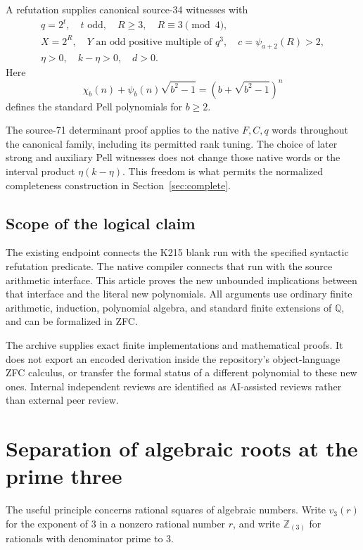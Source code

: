 \documentclass[11pt]{article}
\theoremstyle{definition}
\theoremstyle{remark}
\newcommand{\Z}{\mathbb Z}
\newcommand{\Q}{\mathbb Q}
\newcommand{\vp}{v_3}
\begin{document}
A refutation supplies canonical source-34 witnesses with
\begin{equation}
 \begin{gathered}
 q=2^t,\quad t\text{ odd},\quad R\ge3,\quad R\equiv3\pmod4,\\
 X=2^R,\quad Y\text{ an odd positive multiple of }q^3,\quad
 c=\psi_{a+2}(R)>2,\\
 \eta>0,\quad k-\eta>0,\quad d>0.
 \end{gathered}\label{eq:canonical}
\end{equation}
Here
\[
 \chi_b(n)+\psi_b(n)\sqrt{b^2-1}
      =(b+\sqrt{b^2-1})^n
\]
defines the standard Pell polynomials for \(b\ge2\).

The source-71 determinant proof applies to the native \(F,C,q\) words
throughout the canonical family, including its permitted rank tuning.
The choice of later strong and auxiliary Pell witnesses does not change
those native words or the interval product \(\eta(k-\eta)\).
This freedom is what permits the normalized completeness construction in
Section~\ref{sec:complete}.

\subsection{Scope of the logical claim}

The existing endpoint connects the K215 blank run with the specified
syntactic refutation predicate. The native compiler connects that run
with the source arithmetic interface. This article proves the new
unbounded implications between that interface and the literal new
polynomials. All arguments use ordinary finite arithmetic, induction,
polynomial algebra, and standard finite extensions of \(\Q\), and can
be formalized in ZFC.

The archive supplies exact finite implementations and mathematical
proofs. It does not export an encoded derivation inside the repository's
object-language ZFC calculus, or transfer the formal status of a different
polynomial to these new ones. Internal independent reviews are identified
as AI-assisted reviews rather than external peer review.

\section{Separation of algebraic roots at the prime three}
\label{sec:separation}

The useful principle concerns rational squares of algebraic numbers.
Write \(\vp(r)\) for the exponent of \(3\) in a nonzero rational number
\(r\), and write \(\Z_{(3)}\) for rationals with denominator prime to \(3\).
\end{document}
